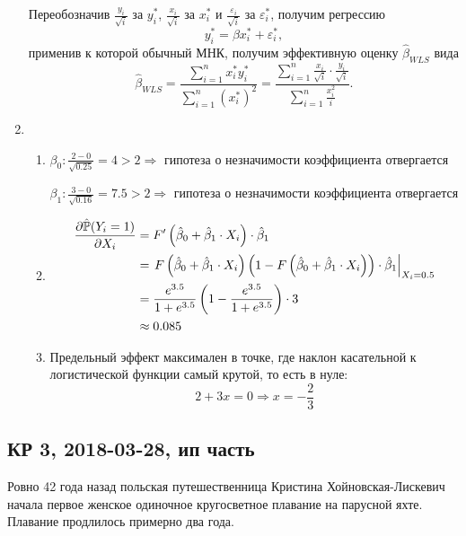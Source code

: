 \begin{enumerate}
\[\]
Переобозначив $\frac{y_i}{\sqrt{i}}$ за $y_i^*$, $\frac{x_i}{\sqrt{i}}$ за
$x_i^*$ и $\frac{\varepsilon_i}{\sqrt{i}}$ за $\varepsilon_i^*$, получим регрессию
\[
y_i^* = \beta x_i^* + \varepsilon_i^*,
\]
применив к которой обычный МНК, получим эффективную оценку $\hat \beta_{WLS}$ вида
\[
\hat \beta_{WLS} = \frac{\sum_{i=1}^n x_i^* y_i^*}{\sum_{i=1}^n (x_i^*)^2} = \frac{\sum_{i=1}^n \frac{x_i}{\sqrt{i}} \cdot \frac{y_i}{\sqrt{i}}}{\sum_{i=1}^n \frac{x_i^2}{i}}.
\]
\item
\begin{enumerate}
\item $\beta_0: \frac{2 - 0}{\sqrt{0.25}} = 4 > 2 \Rightarrow$ гипотеза о незначимости
коэффициента отвергается

$\beta_1: \frac{3 - 0}{\sqrt{0.16}} = 7.5 > 2 \Rightarrow$ гипотеза о незначимости
коэффициента отвергается
\item
\begin{align*}
\frac{\partial \hat\P(Y_i = 1)}{\partial X_i} &= F'\left(\hat \beta_0 + \hat \beta_1 \cdot X_i\right) \cdot \hat \beta_1 \\
&= \left. F\left(\hat \beta_0 + \hat \beta_1 \cdot X_i\right)\left(1 - F\left(\hat \beta_0 + \hat \beta_1 \cdot X_i\right)\right) \cdot \hat\beta_1 \right|_{X_i=0.5} \\
&= \frac{e^{3.5}}{1+e^{3.5}} \left(1 - \frac{e^{3.5}}{1+e^{3.5}} \right) \cdot 3 \\
&\approx 0.085
\end{align*}
\item Предельный эффект максимален в точке, где наклон касательной к логистической функции
самый крутой, то есть в нуле:
\[
2 + 3x = 0 \Rightarrow x = -\frac{2}{3}
\]
\end{enumerate}
\end{enumerate}




\subsection{КР 3, 2018-03-28, ип часть}


Ровно 42 года назад польская путешественница Кристина Хойновская-Лискевич начала первое женское одиночное кругосветное плавание на парусной яхте.
Плавание продлилось примерно два года.



